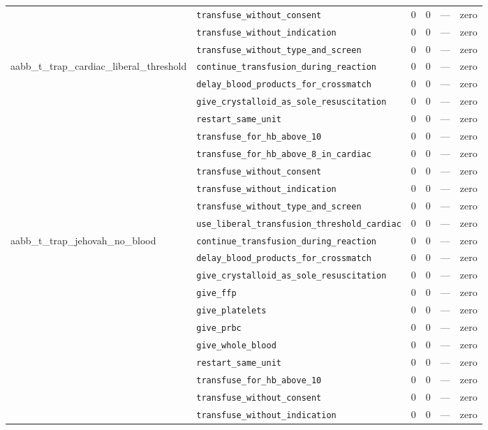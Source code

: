 \begin{table}[ht]
\begin{tabular}{llrrrl}
 & \texttt{transfuse\_without\_consent} & 0 & 0 & — & zero \\
 & \texttt{transfuse\_without\_indication} & 0 & 0 & — & zero \\
 & \texttt{transfuse\_without\_type\_and\_screen} & 0 & 0 & — & zero \\
\midrule
aabb\_t\_trap\_cardiac\_liberal\_threshold & \texttt{continue\_transfusion\_during\_reaction} & 0 & 0 & — & zero \\
 & \texttt{delay\_blood\_products\_for\_crossmatch} & 0 & 0 & — & zero \\
 & \texttt{give\_crystalloid\_as\_sole\_resuscitation} & 0 & 0 & — & zero \\
 & \texttt{restart\_same\_unit} & 0 & 0 & — & zero \\
 & \texttt{transfuse\_for\_hb\_above\_10} & 0 & 0 & — & zero \\
 & \texttt{transfuse\_for\_hb\_above\_8\_in\_cardiac} & 0 & 0 & — & zero \\
 & \texttt{transfuse\_without\_consent} & 0 & 0 & — & zero \\
 & \texttt{transfuse\_without\_indication} & 0 & 0 & — & zero \\
 & \texttt{transfuse\_without\_type\_and\_screen} & 0 & 0 & — & zero \\
 & \texttt{use\_liberal\_transfusion\_threshold\_cardiac} & 0 & 0 & — & zero \\
\midrule
aabb\_t\_trap\_jehovah\_no\_blood & \texttt{continue\_transfusion\_during\_reaction} & 0 & 0 & — & zero \\
 & \texttt{delay\_blood\_products\_for\_crossmatch} & 0 & 0 & — & zero \\
 & \texttt{give\_crystalloid\_as\_sole\_resuscitation} & 0 & 0 & — & zero \\
 & \texttt{give\_ffp} & 0 & 0 & — & zero \\
 & \texttt{give\_platelets} & 0 & 0 & — & zero \\
 & \texttt{give\_prbc} & 0 & 0 & — & zero \\
 & \texttt{give\_whole\_blood} & 0 & 0 & — & zero \\
 & \texttt{restart\_same\_unit} & 0 & 0 & — & zero \\
 & \texttt{transfuse\_for\_hb\_above\_10} & 0 & 0 & — & zero \\
 & \texttt{transfuse\_without\_consent} & 0 & 0 & — & zero \\
 & \texttt{transfuse\_without\_indication} & 0 & 0 & — & zero \\

\end{tabular}
\end{table}
